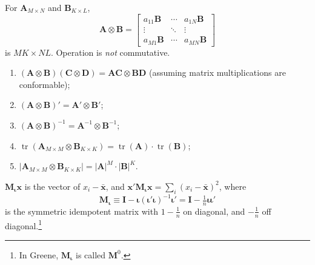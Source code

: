 \documentclass[8pt,letterpaper, landscape]{extarticle} %
\newcommand{\mA}{\ensuremath{\mathbf{A}}}
\newcommand{\mB}{\ensuremath{\mathbf{B}}}
\newcommand{\mC}{\ensuremath{\mathbf{C}}}
\newcommand{\mD}{\ensuremath{\mathbf{D}}}
\newcommand{\mx}{\ensuremath{\mathbf{x}}}
\newcommand{\mI}{\ensuremath{\mathbf{I}}}
\newcommand{\mi}{\ensuremath{\mathbf{\iota}}}
\begin{document}
\begin{multicols}{3}
\begin{description}
 For $ \mA_{M \times N} $ and $ \mB_{K \times L} $,
$$ \mA \otimes \mB = \begin{bmatrix}
a_{11} \mB & \cdots & a_{1N} \mB \\
\vdots & \ddots & \vdots \\
a_{M1} \mB & \cdots & a_{MN} \mB
\end{bmatrix} $$
is $ MK \times NL $. Operation is \textit{not} commutative.
\begin{enumerate}
\item $ (\mA \otimes \mB) (\mC \otimes \mD) = \mA \mC \otimes \mB \mD $ (assuming matrix multiplications are conformable);
\item $ (\mA \otimes \mB)' = \mA' \otimes \mB' $;
\item $ (\mA \otimes \mB)^{-1} = \mA^{-1} \otimes \mB^{-1} $;
\item $ \operatorname{tr} (\mA_{M \times M} \otimes \mB_{K \times K}) = \operatorname{tr} (\mA) \cdot \operatorname{tr} (\mB) $;
\item $ \lvert \mA_{M \times M} \otimes \mB_{K \times K} \rvert = \lvert \mA \rvert^{M} \cdot \lvert \mB \rvert^{K} $.
\end{enumerate}

 $ \mathbf{M}_{\mi} \mx $ is the vector of $ x_i - \bar{\mx} $, and $ \mx' \mathbf{M}_{\mi} \mx = \sum_{i} (x_i - \bar{\mx})^{2} $, where
\[ \mathbf{M}_{\mi} \equiv \mI - \mi (\mi' \mi)^{-1} \mi' = \mI - \tfrac{1}{n} \mi \mi' \]
is the symmetric idempotent matrix with $ 1 - \tfrac{1}{n} $ on diagonal, and $ - \tfrac{1}{n} $ off diagonal.\footnote{In Greene, $ \mathbf{M}_{\mi} $ is called $ \mathbf{M}^0 $.}
\end{description}
\end{multicols}
\end{document}
